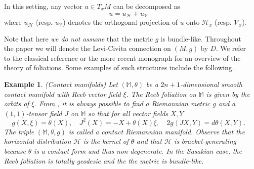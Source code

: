 \documentclass[11pt]{article}
\numberwithin{equation}{section}
\newtheorem{example}[theorem]{Example}
\newcommand{\Ho}{\mathcal H}
\newcommand{\V}{\mathcal V}
\newcommand{\M}{\mathbb M}
\begin{document}
    In this setting, any vector $u \in T_xM$ can  be decomposed as 
	\[
	u=u_\mathcal{H} +u_\mathcal{V}
	\]
	where $u_\mathcal{H}$ (resp. $u_\mathcal{V}$) denotes the orthogonal projection of $u$ onto $\mathcal{H}_x$  (resp. $\mathcal{V}_x$). 

Note that here \emph{we do not assume} that the metric $g$ is bundle-like. Throughout the paper we will denote  the Levi-Civita connection on $(M,g)$ by $D$. 
We refer  to the classical reference  \cite{Tondeur} or the more recent monograph \cite{Gromoll} for an overview of the theory of foliations.
	Some examples of such structures include the following.
 
\begin{example}\label{Example contact}(Contact manifolds)
 Let $(\M,\theta)$ be a $2n+1$-dimensional smooth contact manifold with Reeb vector field $\xi$. The Reeb foliation on $\M$ is given by the orbits of $\xi$.  From  \cite{Sasaki60}, it is always possible to find a Riemannian metric $g$ and a $(1,1)$-tensor field $J$ on $\M$ so that for all vector fields $X, Y$
\begin{equation} \label{JmapKCont}
g(X,\xi)=\theta(X),\quad J^2(X)=-X+\theta (X) \xi, \quad 2g(JX,Y)= d\theta(X,Y).
\end{equation}
The triple $(\M, \theta,g)$ is called a contact Riemannian manifold. Observe that the horizontal distribution $\Ho$ is  the kernel of $\theta$ and that $\Ho$ is bracket-generating because $\theta$ is a contact form and thus non-degenerate. In the Sasakian case, the Reeb foliation is totally geodesic and the the metric is bundle-like.
\end{example}

\end{document}
